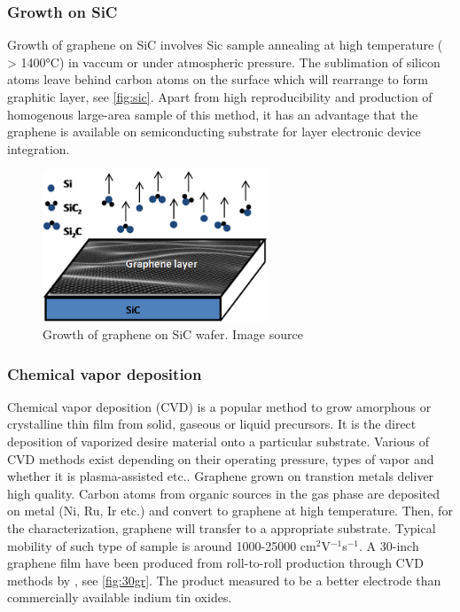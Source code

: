 \subsubsection{Growth on SiC}

Growth of graphene on SiC involves Sic sample annealing at high temperature ( > 1400\si{\celsius}) in vaccum or under atmospheric pressure. The sublimation of silicon atoms leave behind carbon atoms on the surface which will rearrange to form graphitic layer\cite{Mishra2016}, see \autoref{fig:sic}. Apart from high reproducibility and production of homogenous large-area sample of this method, it has an advantage that the graphene is available on semiconducting substrate for layer electronic device integration. 

\begin{figure}[htbp!] 
\centering  
\includegraphics[width=0.6\textwidth]{gr-sic.png}
\caption{Growth of graphene on SiC wafer. Image source \cite{mishra2016graphene}}  
\label{fig:sic}
\end{figure} 

\subsubsection{Chemical vapor deposition}

Chemical vapor deposition (CVD) is a popular method to grow amorphous or crystalline thin film from solid, gaseous or liquid precursors. It is the direct deposition of vaporized desire material onto a particular substrate. Various of CVD methods exist depending on their operating pressure, types of vapor and whether it is plasma-assisted etc.. Graphene grown on transtion metals deliver high quality. Carbon atoms from organic sources in the gas phase are deposited on metal (Ni, Ru, Ir etc.) and convert to graphene at high temperature. Then, for the characterization, graphene will transfer to a appropriate substrate. Typical mobility of such type of sample is around 1000-25000 cm$^2$V$^{-1}$s$^{-1}$\cite{Petrone2012}. A 30-inch graphene film have been produced from roll-to-roll production through CVD methods by \citet{Bae2010}, see \autoref{fig:30gr}. The product measured to be a better electrode than commercially available indium tin oxides.

